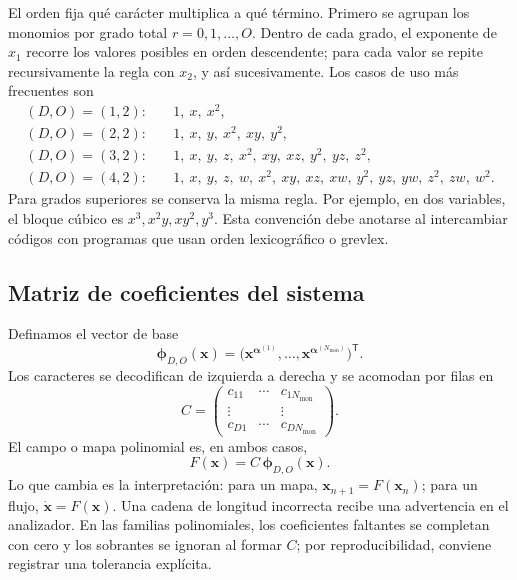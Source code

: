 El orden fija qué carácter multiplica a qué término. Primero se
agrupan los monomios por grado total \(r=0,1,\ldots,O\). Dentro de cada grado, el
exponente de \(x_1\) recorre los valores posibles en orden descendente; para cada
valor se repite recursivamente la regla con \(x_2\), y así sucesivamente. Los casos
de uso más frecuentes son
\[
\begin{aligned}
(D,O)=(1,2):\quad&
 1,\ x,\ x^2,\\
(D,O)=(2,2):\quad&
 1,\ x,\ y,\ x^2,\ xy,\ y^2,\\
(D,O)=(3,2):\quad&
 1,\ x,\ y,\ z,\ x^2,\ xy,\ xz,\ y^2,\ yz,\ z^2,\\
(D,O)=(4,2):\quad&
 1,\ x,\ y,\ z,\ w,\ x^2,\ xy,\ xz,\ xw,\ y^2,\ yz,\ yw,\ z^2,\ zw,\ w^2 .
\end{aligned}
\]
Para grados superiores se conserva la misma regla. Por ejemplo, en dos variables,
el bloque cúbico es \(x^3,x^2y,xy^2,y^3\). Esta convención debe anotarse al
intercambiar códigos con programas que usan orden lexicográfico o grevlex.

\subsection{Matriz de coeficientes del sistema}

Definamos el vector de base
\[
 \boldsymbol{\phi}_{D,O}(\mathbf{x})
 =\bigl(\mathbf{x}^{\boldsymbol{\alpha}^{(1)}},\ldots,
        \mathbf{x}^{\boldsymbol{\alpha}^{(N_{\mathrm{mon}})}}\bigr)^{\mathsf T}.
\]
Los caracteres se decodifican de izquierda a derecha y se acomodan por filas en
\[
 C=
 \begin{pmatrix}
 c_{11}&\cdots&c_{1N_{\mathrm{mon}}}\\
 \vdots&&\vdots\\
 c_{D1}&\cdots&c_{DN_{\mathrm{mon}}}
 \end{pmatrix}.
\]
El campo o mapa polinomial es, en ambos casos,
\[
 F(\mathbf{x})=C\,\boldsymbol{\phi}_{D,O}(\mathbf{x}).
\]
Lo que cambia es la interpretación: para un mapa,
\(\mathbf{x}_{n+1}=F(\mathbf{x}_n)\); para un flujo,
\(\dot{\mathbf{x}}=F(\mathbf{x})\). Una cadena de longitud incorrecta recibe una
advertencia en el analizador. En las familias polinomiales, los coeficientes
faltantes se completan con cero y los sobrantes se ignoran al formar \(C\); por
reproducibilidad, conviene registrar una tolerancia explícita.

